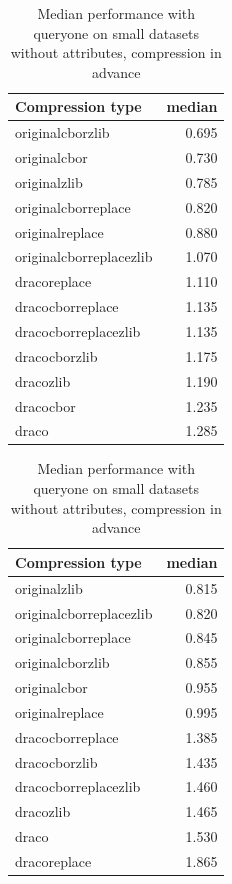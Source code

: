 \begin{table}[!h]
    \begin{minipage}{.5\linewidth}
      \caption{
Median performance with queryone on small datasets, compression in advance}
\centering

\begin{tabular}{|l|r|}
\hline
Compression type & median\\
\hline
originalcborzlib & 0.695\\
\hline
originalcbor & 0.730\\
\hline
originalzlib & 0.785\\
\hline
originalcborreplace & 0.820\\
\hline
originalreplace & 0.880\\
\hline
originalcborreplacezlib & 1.070\\
\hline
dracoreplace & 1.110\\
\hline
dracocborreplace & 1.135\\
\hline
dracocborreplacezlib & 1.135\\
\hline
dracocborzlib & 1.175\\
\hline
dracozlib & 1.190\\
\hline
dracocbor & 1.235\\
\hline
draco & 1.285\\
\hline
\end{tabular}
\end{minipage}%
    \begin{minipage}{.5\linewidth}
      \centering
        \caption{
Median performance with queryone on small datasets without attributes, compression in advance}

\begin{tabular}{|l|r|}
\hline
Compression type & median\\
\hline
originalzlib & 0.815\\
\hline
originalcborreplacezlib & 0.820\\
\hline
originalcborreplace & 0.845\\
\hline
originalcborzlib & 0.855\\
\hline
originalcbor & 0.955\\
\hline
originalreplace & 0.995\\
\hline
dracocborreplace & 1.385\\
\hline
dracocborzlib & 1.435\\
\hline
dracocborreplacezlib & 1.460\\
\hline
dracozlib & 1.465\\
\hline
draco & 1.530\\
\hline
dracoreplace & 1.865\\
\hline
\end{tabular}
\end{minipage} 
\end{table}


